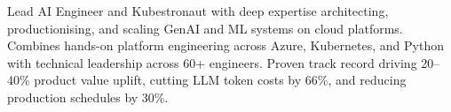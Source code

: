 \small{Lead AI Engineer and Kubestronaut with deep expertise architecting, productionising, and scaling GenAI and ML systems on cloud platforms. Combines hands-on platform engineering across Azure, Kubernetes, and Python with technical leadership across 60+ engineers. Proven track record driving 20–40\% product value uplift, cutting LLM token costs by 66\%, and reducing production schedules by 30\%.}
